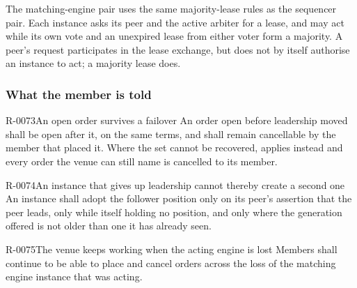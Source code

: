 The matching-engine pair uses the same majority-lease rules as the sequencer
pair. Each instance asks its peer and the active arbiter for a lease, and may
act while its own vote and an unexpired lease from either voter form a majority.
A peer's request participates in the lease exchange, but does not by itself
authorise an instance to act; a majority lease does.

\subsubsection{What the member is told}
\label{sec:ha:enabled:me:member}

\begin{requirement}{R-0073}{An open order survives a failover}
  An order open before leadership moved shall be open after it, on the same
  terms, and shall remain cancellable by the member that placed it. Where the set
  cannot be recovered,  applies instead and every order the venue
  can still name is cancelled to its member.
\end{requirement}

\begin{requirement}{R-0074}{An instance that gives up leadership cannot thereby create a second one}
  An instance shall adopt the follower position only on its peer's assertion that
  the peer leads, only while itself holding no position, and only where the
  generation offered is not older than one it has already seen.
\end{requirement}

\begin{requirement}{R-0075}{The venue keeps working when the acting engine is lost}
  Members shall continue to be able to place and cancel orders across the loss
  of the matching engine instance that was acting.
\end{requirement}

